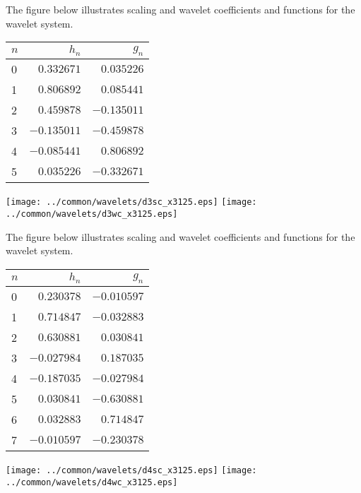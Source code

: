 \begin{example}
\label{ex:sw_gh_d3}
The figure below illustrates scaling and wavelet coefficients and functions
for the  wavelet system.\\
  \parbox[b][35\tw/160][c]{5\tw/16}{\footnotesize\begin{tabular}[b]{l|r|r}
    $n$ & $h_n $ & $ g_n $ \\
    \hline
      0   & $ 0.332671$  & $ 0.035226$  \\
      1   & $ 0.806892$  & $ 0.085441$  \\
      2   & $ 0.459878$  & $-0.135011$  \\
      3   & $-0.135011$  & $-0.459878$  \\
      4   & $-0.085441$  & $ 0.806892$  \\
      5   & $ 0.035226$  & $-0.332671$  \\
  \end{tabular}}
  \texttt{[image: ../common/wavelets/d3sc\_x3125.eps]}
  \texttt{[image: ../common/wavelets/d3wc\_x3125.eps]}
\end{example}

\begin{example}
\label{ex:sw_gh_d4}
The figure below illustrates scaling and wavelet coefficients and functions
for the  wavelet system.\\
  \parbox[b][35\tw/160][c]{5\tw/16}{\footnotesize\begin{tabular}[b]{l|r|r}
    $n$ & $h_n $ & $ g_n $ \\
    \hline
      0   & $ 0.230378$  & $-0.010597$  \\
      1   & $ 0.714847$  & $-0.032883$  \\
      2   & $ 0.630881$  & $ 0.030841$  \\
      3   & $-0.027984$  & $ 0.187035$  \\
      4   & $-0.187035$  & $-0.027984$  \\
      5   & $ 0.030841$  & $-0.630881$  \\
      6   & $ 0.032883$  & $ 0.714847$  \\
      7   & $-0.010597$  & $-0.230378$  \\
  \end{tabular}}
  \texttt{[image: ../common/wavelets/d4sc\_x3125.eps]}
  \texttt{[image: ../common/wavelets/d4wc\_x3125.eps]}
\end{example}

